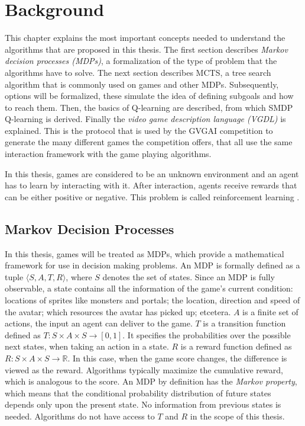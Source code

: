 \chapter{Background}
\label{sec:background}

This chapter explains the most important concepts needed to understand the
algorithms that are proposed in this thesis. The first section describes
\emph{Markov decision processes (MDPs)}, a formalization of the type of problem
that the algorithms have to solve. The next section describes MCTS, a tree
search algorithm that is commonly used on games and other MDPs. Subsequently,
options will be formalized, these simulate the idea of defining subgoals and
how to reach them. Then, the basics of Q-learning are described, from which SMDP
Q-learning is derived. Finally the \emph{video game description language (VGDL)}
is explained. This is the protocol that is used by the GVGAI competition to
generate the many different games the competition offers, that all use the same
interaction framework with the game playing algorithms.

In this thesis, games are considered to be an unknown environment and an agent
has to learn by interacting with it. After interaction, agents receive
rewards that can be either positive or negative. This problem is called
reinforcement learning \cite{wiering2012reinforcement}.

\section{Markov Decision Processes}
\label{subsec:mdps}
In this thesis, games will be treated as MDPs, which provide a mathematical
framework for use in decision making problems. An MDP is formally defined as a
tuple $\langle S, A, T, R \rangle$, where $S$ denotes the set of states. Since an MDP
is fully observable, a state contains all the information of the
game's current condition: locations of sprites like monsters and portals; the
location, direction and speed of the avatar; which resources the avatar has
picked up; etcetera. $A$ is a finite set of actions, the input an agent can
deliver to the game. $T$ is a transition function defined as $T : S \times A
\times S \rightarrow \left[0,1\right]$. It specifies the probabilities over the
possible next states, when taking an action in a state.  $R$ is a reward
function defined as $R: S \times A \times S \rightarrow \mathbb{R}$. In this
case, when the game score changes, the difference is viewed as the reward.
Algorithms typically maximize the cumulative reward, which is analogous to the
score. An MDP by definition has the \emph{Markov property}, which means that the
conditional probability distribution of future states depends only upon the
present state. No information from previous states is needed. Algorithms do not
have access to $T$ and $R$ in the scope of this thesis.

